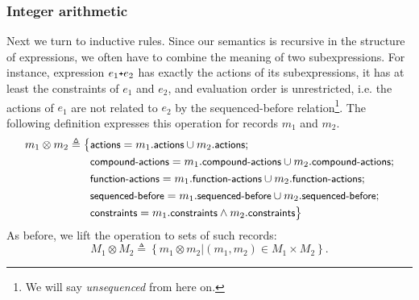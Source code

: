 \documentclass[a4paper,12pt]{scrbook}
\theoremstyle{plain}
\theoremstyle{definition}
\newcommand{\sem}[1]{{\small{\textsf{#1}}}}
\newcommand{\proj}[2]{
  #2.\sem{#1}
}
\newcommand{\define}[0]{\triangleq}
\newcommand{\cc}[1]{{\text{\footnotesize\ttfamily{#1}}}}
\begin{document}
\subsubsection{Integer arithmetic}\label{arithmetic}
Next we turn to inductive rules. Since our semantics is recursive in the
structure of expressions, we often have to combine the meaning of two
subexpressions. For instance, expression $e_1 \cc{+} e_2$ has exactly the
actions of its subexpressions, it has at least the constraints of $e_1$ and
$e_2$, and evaluation order is unrestricted, i.e. the actions of $e_1$ are not
related to $e_2$ by the \sem{sequenced-before} relation\footnote{We will say
  \textit{unsequenced} from here on.}. The following definition expresses this
operation for records $m_1$ and $m_2$.
\begin{equation*}
  \begin{aligned}
    m_1 \otimes m_2 \define \big\{ 
    &\sem{actions} = \proj{actions} {m_1} \cup \proj{actions} {m_2} ; \\
    &\sem{compound-actions} =
      \proj{compound-actions} {m_1} \cup \proj{compound-actions} {m_2} ; \\
    &\sem{function-actions} =
      \proj{function-actions} {m_1} \cup \proj{function-actions} {m_2} ; \\
    &\sem{sequenced-before} = 
      \proj{sequenced-before} {m_1} \cup
      \proj{sequenced-before} {m_2} ; \\
    &\sem{constraints} =
      \proj{constraints} {m_1} \wedge \proj{constraints}{m_2} \big\}
  \end{aligned}
\end{equation*}
As before, we lift the operation to sets of such records:
\begin{equation*}
M_1 \otimes M_2 \define \left\{
  m_1 \otimes m_2 \vert \left( m_1, m_2\right) \in M_1 \times M_2
\right\} .
\end{equation*}
\end{document}
